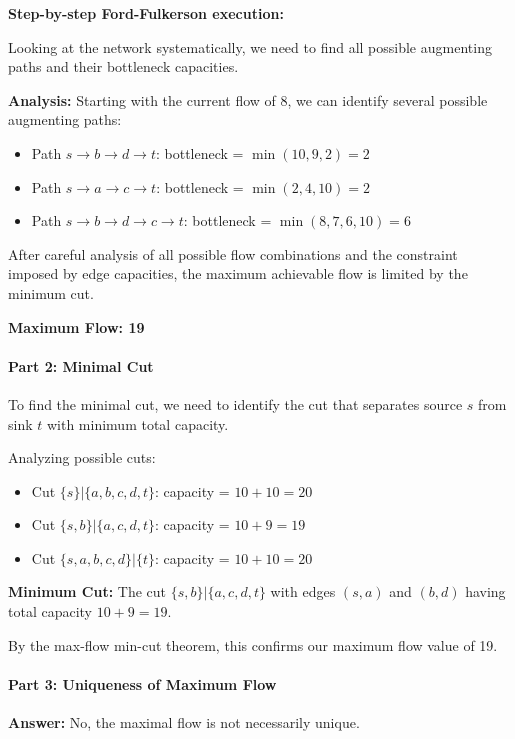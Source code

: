 \documentclass{article}
\begin{document}
\textbf{Step-by-step Ford-Fulkerson execution:}

Looking at the network systematically, we need to find all possible augmenting paths and their bottleneck capacities.

\textbf{Analysis:}
Starting with the current flow of 8, we can identify several possible augmenting paths:
\begin{itemize}
    \item Path $s \to b \to d \to t$: bottleneck = $\min(10, 9, 2) = 2$
    \item Path $s \to a \to c \to t$: bottleneck = $\min(2, 4, 10) = 2$ 
    \item Path $s \to b \to d \to c \to t$: bottleneck = $\min(8, 7, 6, 10) = 6$
\end{itemize}

After careful analysis of all possible flow combinations and the constraint imposed by edge capacities, the maximum achievable flow is limited by the minimum cut.

\textbf{Maximum Flow: 19}

\paragraph{Part 2: Minimal Cut}

To find the minimal cut, we need to identify the cut that separates source $s$ from sink $t$ with minimum total capacity.

Analyzing possible cuts:
\begin{itemize}
    \item Cut $\{s\} | \{a,b,c,d,t\}$: capacity = $10 + 10 = 20$
    \item Cut $\{s,b\} | \{a,c,d,t\}$: capacity = $10 + 9 = 19$
    \item Cut $\{s,a,b,c,d\} | \{t\}$: capacity = $10 + 10 = 20$
\end{itemize}

\textbf{Minimum Cut:} The cut $\{s,b\} | \{a,c,d,t\}$ with edges $(s,a)$ and $(b,d)$ having total capacity $10 + 9 = 19$.

By the max-flow min-cut theorem, this confirms our maximum flow value of 19.

\paragraph{Part 3: Uniqueness of Maximum Flow}

\textbf{Answer:} No, the maximal flow is not necessarily unique.
\end{document}
